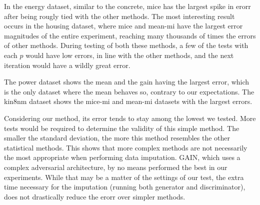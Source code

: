 \documentclass[12pt]{article}
\begin{document}
%	
In the energy dataset, similar to the concrete, mice has the largest spike in erorr
after being rougly tied with the other methods.
The most interesting result occurs in the housing dataset, where
mice and mean-mi have the largest error magnitudes of the entire experiment, 
reaching many thousands of times the errors of other methods.
During testing of both these methods, a few of the tests with each $p$ would have low errors,
in line with the other methods, and the next iteration would have a
wildly great error.

The power dataset shows the mean and the gain having the largest error, 
which is the only dataset where the mean behaves so, contrary to our
expectations.
The kin8nm dataset shows the mice-mi and mean-mi datasets with the largest errors.

Considering our method, its error tends to stay among the lowest we tested.
More tests would be required to determine the validity of this simple method.
The smaller the standard deviation, the more this method resembles the
other statistical methods.
This shows that more complex methods are not necessarily the most appropriate
when performing data imputation.
GAIN, which uses a complex adversarial architecture, by no means performed
the best in our experiments.
While that may be a matter of the settings of our test, the extra
time necessary for the imputation (running both generator and discriminator),
does not drastically reduce the erorr over simpler methods.
\end{document}

